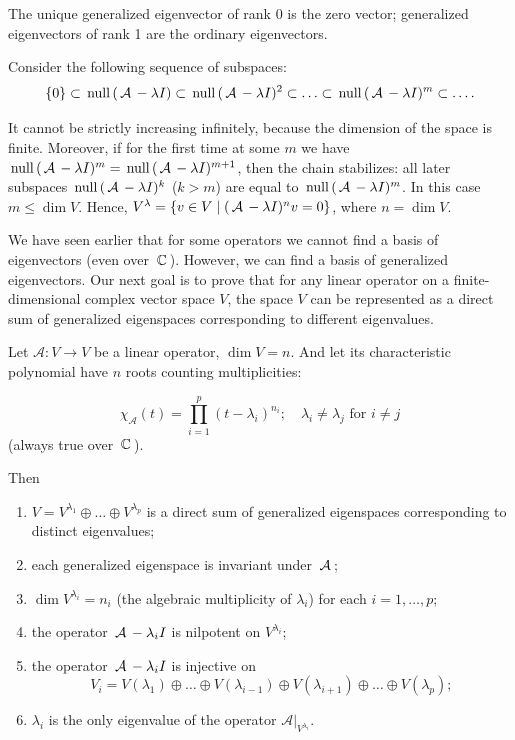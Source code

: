 The unique generalized eigenvector of rank 0 is the zero vector; generalized eigenvectors of rank 1 are the ordinary eigenvectors.

Consider the following sequence of subspaces:
$$
\{0\} \subset \,\mathrm{null}\,(\,\mathcal{A}\, - \lambda I) \subset \,\mathrm{null}\,(\,\mathcal{A}\, - \lambda I)^2 \subset \ldots \subset \,\mathrm{null}\,(\,\mathcal{A}\, - \lambda I)^m \subset \ldots.
$$

It cannot be strictly increasing infinitely, because the dimension of the space is finite. Moreover, if for the first time at some $m$ we have $\,\mathrm{null}\,(\,\mathcal{A}\, - \lambda I)^m = \,\mathrm{null}\,(\,\mathcal{A}\, - \lambda I)^{m + 1}$, then the chain stabilizes: all later subspaces $\,\mathrm{null}\,(\,\mathcal{A}\, - \lambda I)^k$ ($k > m$) are equal to $\,\mathrm{null}\,(\,\mathcal{A}\, - \lambda I)^m$. In this case $m \leqslant \dim V$. Hence, $V^{\lambda} = \{v \in V \mid (\,\mathcal{A}\, - \lambda I)^n v = 0\}$, where $n = \dim V$.

We have seen earlier that for some operators we cannot find a basis of eigenvectors (even over $\,\mathbb{C}\,$). However, we can find a basis of generalized eigenvectors. Our next goal is to prove that for any linear operator on a finite-dimensional complex vector space $V$, the space $V$ can be represented as a direct sum of generalized eigenspaces corresponding to different eigenvalues.

\begin{theorem}
Let $\mathcal{A}: V \rightarrow V$ be a linear operator, $\dim V = n$. And let its characteristic polynomial have $n$ roots counting multiplicities:

    $$
    \chi_{\mathcal{A}}(t)=\prod_{i=1}^p\left(t-\lambda_i\right)^{n_i} ; \quad \lambda_i \neq \lambda_j \text{ for } i \neq j
    $$
    (always true over $\,\mathbb{C}\,$).
    
Then 
\begin{enumerate}[(1)]
    \item $V=V^{\lambda_1} \oplus \ldots \oplus V^{\lambda_p}$ is a direct sum of generalized eigenspaces corresponding to distinct eigenvalues;
    \item each generalized eigenspace is invariant under $\,\mathcal{A}\,$;
    \item $\dim V^{\lambda_i} = n_i$ (the algebraic multiplicity of $\lambda_i$) for each $i = 1, \ldots, p$;
    \item the operator $\,\mathcal{A}\, - \lambda_i I$ is nilpotent on $V^{\lambda_i}$;
    \item the operator $\,\mathcal{A}\, - \lambda_i I$ is injective on $$
V_i=V\left(\lambda_1\right) \oplus \ldots \oplus V\left(\lambda_{i-1}\right) \oplus V\left(\lambda_{i+1}\right) \oplus \ldots \oplus V\left(\lambda_p\right);
$$
\item $\lambda_i$ is the only eigenvalue of the operator $\left.\mathcal{A}\right|_{V^{\lambda_i}}$.
\end{enumerate}
\end{theorem}

